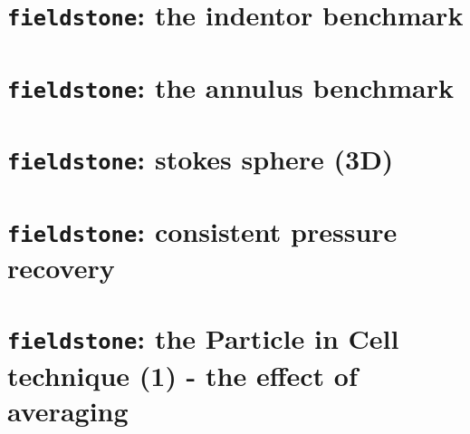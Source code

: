 \documentclass[a4paper]{article}
\begin{document}
\newpage
\section{{\tt fieldstone}: the indentor benchmark}


\newpage
\section{{\tt fieldstone}: the annulus benchmark}



\newpage
\section{{\tt fieldstone}: stokes sphere (3D)}


\newpage
\section{{\tt fieldstone}: consistent pressure recovery }


\newpage
\section{{\tt fieldstone}: the Particle in Cell technique (1) - the effect of averaging}

\end{document}
